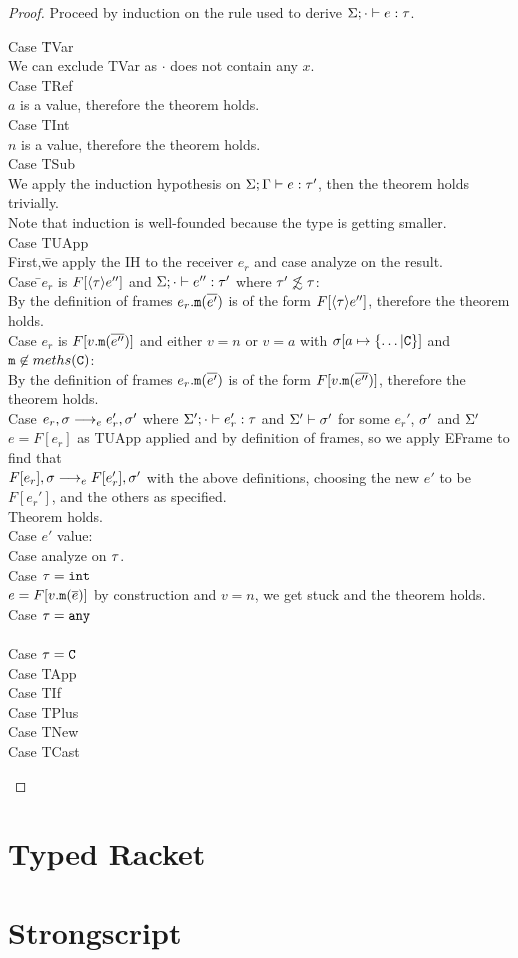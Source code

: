 \documentclass{report}
\begin{document}
\begin{proof}
Proceed by induction on the rule used to derive $\S;\cdot \vdash e : \t$.
\begin{tabbing}
Case \=TVar\\
\> We can exclude TVar as $\cdot$ does not contain any $x$.\\
Case TRef\\
\> $a$ is a value, therefore the theorem holds. \\
Case TInt\\
\> $n$ is a value, therefore the theorem holds. \\
Case TSub\\
\> We apply the induction hypothesis on $\GSdash e : \t'$, then the theorem holds trivially.\\
\> Note that induction is well-founded because the type is getting smaller. \\
Case TUApp\\
\> First,\= we apply the IH to the receiver $e_r$ and case analyze on the result.\\
\> \> Case \=$e_r$ is $F[\cast{\t}e'']$ and $\S;\cdot \vdash e'' : \t'$ where $\t' \not\lesssim \t$:\\
\> \> \> By the definition of frames $e_r.\m(\bar{e'})$ is of the form $F[\cast{\t}e'']$, therefore the theorem holds.\\
\> \> Case $e_r$ is $F[v.\m(\bar{e''})]$ and either $v = n$ or $v = a$ with $\s[a\mapsto \{ \ldots | \C \}]$ and $\m \not\in meths(\C)$:\\
\> \> \> By the definition of frames $e_r.\m(\bar{e'})$ is of the form $F[v.\m(\bar{e''})]$, therefore the theorem holds.\\
\> \> Case $e_r,\s \ereduce e_r',\s'$ where $\S';\cdot \vdash e_r' : \t$ and $\S' \vdash \s'$ for some $e_r'$, $\s'$ and $\S'$\\
\> \> \> $e = F[e_r]$ as TUApp applied and by definition of frames, so we apply EFrame to find that\\
\> \> \> $F[e_r],\s \ereduce F[e_r'],\s'$ with the above definitions, choosing the new $e'$ to be $F[e_r']$, and the others as specified.\\
\> \> \> Theorem holds.\\
\> \> Case $e'$ value:\\
\> Case analyze on $\t$.\\
\> \> Case $\t = \int$\\
\> \> \> $e = F[v.\m(\bar{e})]$ by construction and $v = n$, we get stuck and the theorem holds.\\
\> \> Case $\t = \any$\\
\> \> \> \\
\> \> Case $\t = \C$\\
Case TApp\\
Case TIf\\
Case TPlus\\
Case TNew\\
Case TCast\\
\end{tabbing}
\end{proof}
\section{Typed Racket}
\section{Strongscript}
\end{document}
